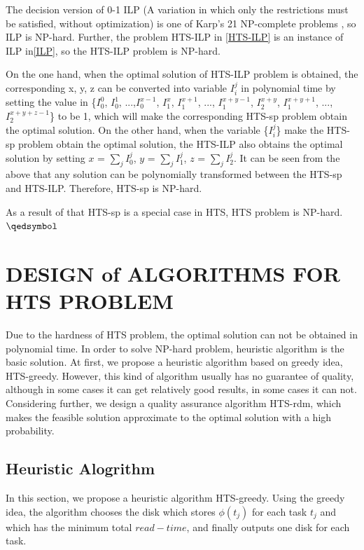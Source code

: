 \documentclass[conference]{IEEEtran}
\begin{document}
The decision version of 0-1 ILP (A variation in which only the restrictions must be satisfied, without optimization) is one of Karp's 21 NP-complete problems  \cite{b9}, so ILP is NP-hard. Further, the problem HTS-ILP in \ref{HTS-ILP} is an instance of ILP in\ref{ILP}, so the HTS-ILP problem is NP-hard.

On the one hand, when the optimal solution of HTS-ILP problem is obtained, the corresponding {x, y, z} can be converted into variable {$I_i^j$} in polynomial time by setting the value in \{$I_0^0$, $I_0^1$, ...,$I_0^{x-1}$, $I_1^{x}$, $I_1^{x+1}$, ..., $I_1^{x+y-1}$, $I_2^{x+y}$, $I_1^{x+y+1}$, ..., $I_2^{x+y+z-1}$\} to be 1, which will make the corresponding HTS-sp problem obtain the optimal solution. On the other hand, when the variable \{$I_i^j$\} make the HTS-sp problem obtain the optimal solution, the HTS-ILP also obtains the optimal solution by setting $x$ = $\sum_{j}I_0^j$, $y$ = $\sum_{j}I_1^j$, $z$ = $\sum_{j}I_2^j$. It can be seen from the above that any solution can be polynomially transformed between the HTS-sp and HTS-ILP. Therefore, HTS-sp is NP-hard. 

As a result of that HTS-sp is a special case in HTS, HTS problem is NP-hard.\hfill $\qedsymbol$

\section{DESIGN of ALGORITHMS FOR HTS PROBLEM}\label{DESIGN_ALGORITHM}

Due to the hardness of HTS problem, the optimal solution can not be obtained in polynomial time. In order to solve NP-hard problem, heuristic algorithm is the basic solution. At first, we propose a heuristic algorithm based on greedy idea, HTS-greedy. However, this kind of algorithm usually has no guarantee of quality, although in some cases it can get relatively good results, in some cases it can not. Considering further, we design a quality assurance algorithm HTS-rdm, which makes the feasible solution approximate to the optimal solution with a high probability.


\subsection{Heuristic Alogrithm}\label{Heuristic}

In this section, we propose a heuristic algorithm HTS-greedy. Using the greedy idea, the algorithm chooses the disk which stores $\phi(t_j)$ for each task $t_j$ and which has the minimum total $read-time$, and finally outputs one disk for each task.
\end{document}
